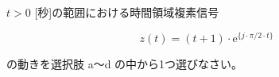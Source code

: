 $t > 0$ [秒]の範囲における時間領域複素信号 

\[
z(t) = (t+1) \cdot \textrm{e}^{\{ j \cdot \pi/2 \cdot t\}}
\]

\medskip
\noindent の動きを選択肢 a〜d の中から1つ選びなさい。

